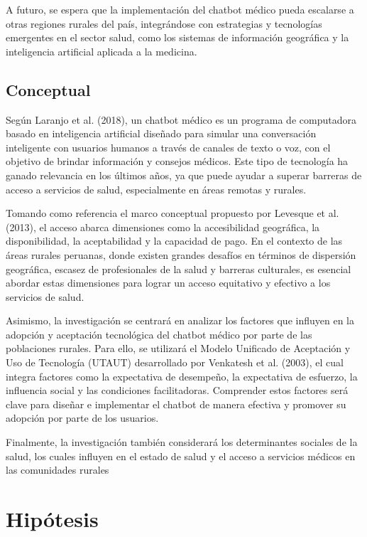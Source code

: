 A futuro, se espera que la implementación del chatbot médico pueda escalarse a otras regiones rurales del país, integrándose con estrategias y tecnologías emergentes en el sector salud, como los sistemas de información geográfica y la inteligencia artificial aplicada a la medicina.

\subsection{Conceptual}
Según Laranjo et al. (2018), un chatbot médico es un programa de computadora basado en inteligencia artificial diseñado para simular una conversación inteligente con usuarios humanos a través de canales de texto o voz, con el objetivo de brindar información y consejos médicos. Este tipo de tecnología ha ganado relevancia en los últimos años, ya que puede ayudar a superar barreras de acceso a servicios de salud, especialmente en áreas remotas y rurales.

Tomando como referencia el marco conceptual propuesto por Levesque et al. (2013), el acceso abarca dimensiones como la accesibilidad geográfica, la disponibilidad, la aceptabilidad y la capacidad de pago. En el contexto de las áreas rurales peruanas, donde existen grandes desafíos en términos de dispersión geográfica, escasez de profesionales de la salud y barreras culturales, es esencial abordar estas dimensiones para lograr un acceso equitativo y efectivo a los servicios de salud.

Asimismo, la investigación se centrará en analizar los factores que influyen en la adopción y aceptación tecnológica del chatbot médico por parte de las poblaciones rurales. Para ello, se utilizará el Modelo Unificado de Aceptación y Uso de Tecnología (UTAUT) desarrollado por Venkatesh et al. (2003), el cual integra factores como la expectativa de desempeño, la expectativa de esfuerzo, la influencia social y las condiciones facilitadoras. Comprender estos factores será clave para diseñar e implementar el chatbot de manera efectiva y promover su adopción por parte de los usuarios.

Finalmente, la investigación también considerará los determinantes sociales de la salud, los cuales influyen en el estado de salud y el acceso a servicios médicos en las comunidades rurales

\section{Hipótesis}

